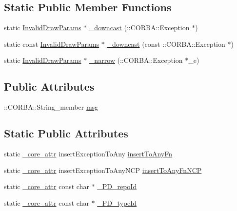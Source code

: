 \subsection*{Static Public Member Functions}
\begin{DoxyCompactItemize}
\item 
static \hyperlink{class_petit_prince_service_1_1_invalid_draw_params}{Invalid\+Draw\+Params} $\ast$ \hyperlink{class_petit_prince_service_1_1_invalid_draw_params_a4b8271e0145b2887842d8f89a92b3357}{\+\_\+downcast} (\+::C\+O\+R\+B\+A\+::\+Exception $\ast$)
\item 
static const \hyperlink{class_petit_prince_service_1_1_invalid_draw_params}{Invalid\+Draw\+Params} $\ast$ \hyperlink{class_petit_prince_service_1_1_invalid_draw_params_a67da7dcd2127f8c7fa4e915582173d8f}{\+\_\+downcast} (const \+::C\+O\+R\+B\+A\+::\+Exception $\ast$)
\item 
static \hyperlink{class_petit_prince_service_1_1_invalid_draw_params}{Invalid\+Draw\+Params} $\ast$ \hyperlink{class_petit_prince_service_1_1_invalid_draw_params_ad3b94cdc567af14f86cbfccb5ad4a9b4}{\+\_\+narrow} (\+::C\+O\+R\+B\+A\+::\+Exception $\ast$\+\_\+e)
\end{DoxyCompactItemize}
\subsection*{Public Attributes}
\begin{DoxyCompactItemize}
\item 
\+::C\+O\+R\+B\+A\+::\+String\+\_\+member \hyperlink{class_petit_prince_service_1_1_invalid_draw_params_ad20b320baca257a2276e76a6efc94a91}{msg}
\end{DoxyCompactItemize}
\subsection*{Static Public Attributes}
\begin{DoxyCompactItemize}
\item 
static \hyperlink{_petit_prince_8hpp_a5f7bf7cddb608c2aad7c95f55f8a33c5}{\+\_\+core\+\_\+attr} insert\+Exception\+To\+Any \hyperlink{class_petit_prince_service_1_1_invalid_draw_params_a3c0d3050311043226e9d0a0882d4c25f}{insert\+To\+Any\+Fn}
\item 
static \hyperlink{_petit_prince_8hpp_a5f7bf7cddb608c2aad7c95f55f8a33c5}{\+\_\+core\+\_\+attr} insert\+Exception\+To\+Any\+N\+CP \hyperlink{class_petit_prince_service_1_1_invalid_draw_params_afce432eda8989d47faee11da1a73348e}{insert\+To\+Any\+Fn\+N\+CP}
\item 
static \hyperlink{_petit_prince_8hpp_a5f7bf7cddb608c2aad7c95f55f8a33c5}{\+\_\+core\+\_\+attr} const char $\ast$ \hyperlink{class_petit_prince_service_1_1_invalid_draw_params_a74f67513423e12f170c20552e3286cf1}{\+\_\+\+P\+D\+\_\+repo\+Id}
\item 
static \hyperlink{_petit_prince_8hpp_a5f7bf7cddb608c2aad7c95f55f8a33c5}{\+\_\+core\+\_\+attr} const char $\ast$ \hyperlink{class_petit_prince_service_1_1_invalid_draw_params_abd336eae5a88a48f0b2ae8dac1c8fb57}{\+\_\+\+P\+D\+\_\+type\+Id}
\end{DoxyCompactItemize}


